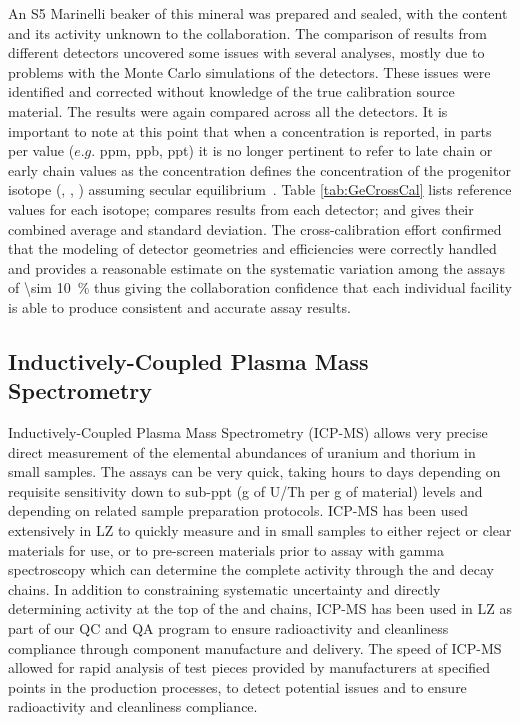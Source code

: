 An S5 Marinelli beaker of this mineral was prepared and sealed, with the content and its activity unknown to the collaboration. The comparison of results from different detectors uncovered some issues with several analyses, mostly due to problems with the Monte Carlo simulations of the detectors. These issues were identified and corrected without knowledge of the true calibration source material. The results were again compared across all the detectors. It is important to note at this point that when a concentration is reported, in parts per value ($e.g.$ ppm, ppb, ppt) it is no longer pertinent to refer to late chain or early chain values as the concentration defines the concentration of the progenitor isotope (\UTTE{ }, \UTTF{}{}, \ThTTT{}) assuming secular equilibrium~\cite{malling:2013jya}. Table \ref{tab:GeCrossCal} lists reference values for each isotope; compares results from each detector; and gives their combined average and standard deviation. The cross-calibration effort confirmed that the modeling of detector geometries and efficiencies were correctly handled and provides a reasonable estimate on the systematic variation among the assays of \SI{\sim 10}{\percent} thus giving the collaboration confidence that each individual facility is able to produce consistent and accurate assay results.


\subsection{Inductively-Coupled Plasma Mass Spectrometry}
\label{subsec:ICPMS}

Inductively-Coupled Plasma Mass Spectrometry (ICP-MS) allows very precise direct measurement of the elemental abundances of uranium and thorium in small samples. The assays can be very quick, taking hours to days depending on requisite sensitivity down to sub-ppt (\si{\gram} of U/Th per \si{\gram} of material) levels and depending on related sample preparation protocols. ICP-MS has been used extensively in LZ to quickly measure \utTe{} and \thtTt{} in small samples to either reject or clear materials for use, or to pre-screen materials prior to  assay with gamma spectroscopy which can determine the complete activity through the \utTe{} and \thtTt{} decay chains. In addition to constraining systematic uncertainty and directly determining activity at the top of the \utTe{} and \thtTt{} chains, ICP-MS has been used in LZ as part of our QC and QA program to ensure radioactivity and cleanliness compliance through component manufacture and delivery. The speed of ICP-MS allowed for rapid analysis of test pieces provided by manufacturers at specified points in the production processes, to detect potential issues and to ensure radioactivity and cleanliness compliance. 

